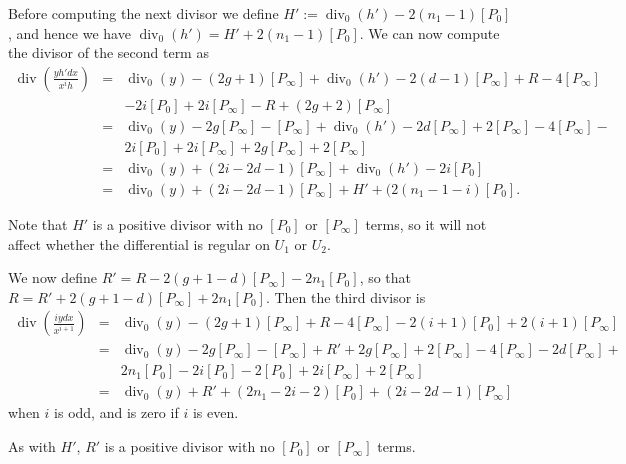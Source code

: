 \documentclass[draft, 11pt]{article} %
\theoremstyle{plain}
\theoremstyle{remark}
\DeclareMathOperator{\di}{div}
\begin{document}
Before computing the next divisor we define $H' := \di_0(h') - 2(n_1 -1)[P_0]$, and hence we have $\di_0(h') = H' + 2(n_1-1)[P_0]$.
We can now compute the divisor of the second term as
\begin{eqnarray*}
\di\left( \frac{yh'dx}{x^ih} \right)  & = & \di_0(y) - (2g+1)[P_\infty] + \di_0(h') - 2(d-1)[P_\infty] + R - 4[P_\infty] \\
& & - 2i[P_0] + 2i[P_\infty] - R + (2g+2)[P_\infty] \\
& = & \di_0(y) - 2g[P_\infty] - [P_\infty] + \di_0(h') - 2d[P_\infty] + 2[P_\infty] - 4[P_\infty] -\\
& & 2i[P_0] + 2i[P_\infty]+ 2g[P_\infty] + 2[P_\infty]  \\
& = & \di_0(y) + (2i-2d-1)[P_\infty] + \di_0(h') - 2i[P_0] \\
& = & \di_0(y) + (2i -2d -1) [P_\infty] + H' + (2(n_1 - 1 - i)[P_0].
\end{eqnarray*}

Note that $H'$ is a positive  divisor with no $[P_0]$ or $[P_\infty]$ terms, so it will not affect whether the differential is regular on $U_1$ or $U_2$.


We now define $R' = R - 2(g+1-d)[P_\infty] - 2n_1[P_0]$, so that $R = R' + 2(g+1-d)[P_\infty] + 2n_1[P_0]$.
Then the third divisor is
\begin{eqnarray*}
\di \left( \frac{iydx}{x^{i+1}} \right) & = & \di_0(y) - (2g+1)[P_\infty] + R - 4[P_\infty] - 2(i+1)[P_0] + 2(i+1)[P_\infty] \\
& = & \di_0(y) - 2g[P_\infty] - [P_\infty] + R' + 2g[P_\infty] + 2[P_\infty] - 4[P_\infty] - 2d[P_\infty] +\\
& &  2n_1[P_0] - 2i[P_0] -2[P_0] + 2i[P_\infty] +2[P_\infty]  \\
& = & \di_0(y) + R' + (2n_1 - 2i -2)[P_0] + (2i -2d -1)[P_\infty]
\end{eqnarray*}
when $i$ is odd, and is zero if $i$ is even.

As with $H'$, $R'$ is a positive divisor with no $[P_0]$ or $[P_\infty]$ terms.
\end{document}
